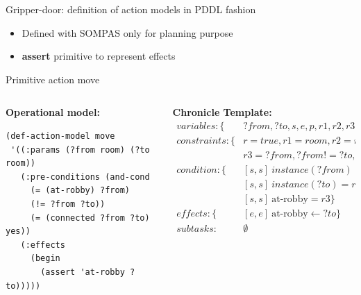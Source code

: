\begin{frame}[fragile]{Gripper-door: definition of action models in PDDL fashion}
    \small
    \begin{itemize}
        \item Defined with SOMPAS only for planning purpose
        \pause
        \item \textbf{assert} primitive to represent effects %
        \pause
    \end{itemize}
    Primitive action move
    \begin{columns}[T] %
        \begin{column}{.48\textwidth}
            \small
            \textbf{Operational model:}
            \tiny
            \begin{lstlisting}
(def-action-model move
 '((:params (?from room) (?to room))
   (:pre-conditions (and-cond 
     (= (at-robby) ?from)
     (!= ?from ?to))
     (= (connected ?from ?to) yes))
   (:effects
     (begin
       (assert 'at-robby ?to)))))
            \end{lstlisting}
        \end{column}%
        \begin{column}{.48\textwidth}
            \small
            \textbf{Chronicle Template:}
            \tiny
            \begin{align*}
            variables: \{&?from, ?to, s, e, p, r1,r2,r3,r\}\\
            constraints: \{&r = true, r1 = room, r2 = room\\
                & r3 = ?from, ?from != ?to, s < e \}\\
            condition:\{&[s,s]\ instance(?from) = r1 \\
                &[s,s]\ instance(?to) = r2\\
                &[s,s]\ \text{at-robby} = r3 \}\\
            effects:\{&[e,e]\ \text{at-robby} \leftarrow ?to\} \\
            subtasks:& \emptyset
            \end{align*}
        \end{column}
    \end{columns}   
    
\end{frame}


